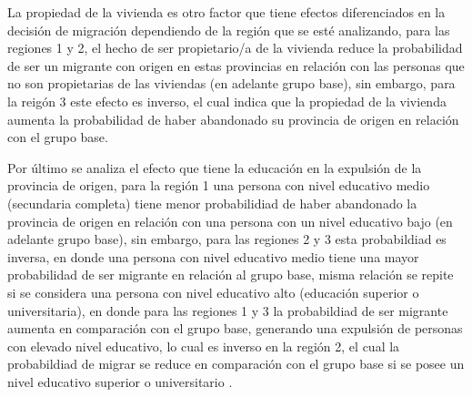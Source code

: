 \documentclass[12pt,a4paper]{article}
\begin{document}
La propiedad de la vivienda es otro factor que tiene efectos diferenciados en la decisión de migración dependiendo de la región que se esté analizando, para las regiones 1 y 2, el hecho de ser propietario/a de la vivienda reduce la probabilidad de ser un migrante con origen en estas provincias en relación con las personas que no son propietarias de las viviendas (en adelante grupo base), sin embargo, para la reigón 3 este efecto es inverso, el cual indica que la propiedad de la vivienda aumenta la probabilidad de haber abandonado su provincia de origen en relación con el grupo base.

Por último se analiza el efecto que tiene la educación en la expulsión de la provincia de origen, para la región 1  una persona con nivel educativo medio (secundaria completa) tiene menor probabilidiad de haber abandonado la provincia de origen en relación con una persona con un nivel educativo bajo (en adelante grupo base), sin embargo, para las regiones 2 y 3 esta probabildiad es inversa, en donde una persona con nivel educativo medio tiene una mayor probabilidad de ser migrante en relación al grupo base, misma relación se repite si se considera una persona con nivel educativo alto (educación superior o universitaria), en donde para las regiones 1 y 3 la probabildiad de ser migrante aumenta en comparación con el grupo base, generando una expulsión de personas con elevado nivel educativo, lo cual es inverso en la región 2, el cual la probabildiad de migrar se reduce en comparación con el grupo base si se posee un nivel educativo superior o universitario .
\end{document}
